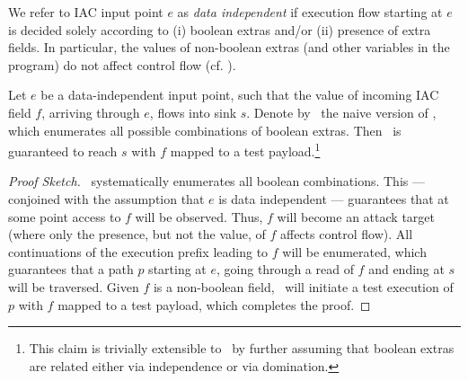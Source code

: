 \begin{definition}\label{De:dataind} We refer to IAC input point $e$ as \emph{data independent} if execution flow starting at $e$ is decided solely according to (i) boolean extras and/or (ii) presence of extra fields. In particular, the values of non-boolean extras (and other variables in the program) do not affect control flow (cf. \cite{SYGABSV:ISSTA14,W:POPL86}).
\end{definition}

\begin{theorem}[Coverage] Let $e$ be a data-independent input point, such that the value of incoming IAC field $f$, arriving through $e$, flows into sink $s$. 
	Denote by \ETool\ the naive version of \Tool, which enumerates all possible combinations of boolean extras.
	Then \ETool\ is guaranteed to reach $s$ with $f$ mapped to a test payload.\footnote{
		This claim is trivially extensible to \Tool\ by further assuming that boolean extras are related either via independence or via domination.
	}
	\begin{proof}[Proof Sketch] \ETool\ systematically enumerates all boolean combinations. This --- conjoined with the assumption that $e$ is data independent --- guarantees that at some point access to $f$ will be observed. Thus, $f$ will become an attack target (where only the presence, but not the value, of $f$ affects control flow). All continuations of the execution prefix leading to $f$ will be enumerated, which guarantees that a path $p$ starting at $e$, going through a read of $f$ and ending at $s$ will be traversed. Given $f$ is a non-boolean field, \ETool\ will initiate a test execution of $p$ with $f$ mapped to a test payload, which completes the proof.
	\end{proof}
\end{theorem}